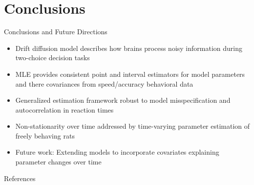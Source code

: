 \documentclass[8pt]{beamer}
\begin{document}
\section{Conclusions}

\begin{frame}{Conclusions and Future Directions}
    \begin{itemize}
        \item Drift diffusion model describes how brains process noisy information during two-choice decision tasks \vspace{0.25cm}
        
        \item MLE provides consistent point and interval estimators for model parameters and there covariances from speed/accuracy behavioral data \vspace{0.25cm}
        
        \item Generalized estimation framework robust to model misspecification and autocorrelation in reaction times \vspace{0.25cm}
        
        \item Non-stationarity over time addressed by time-varying parameter estimation of freely behaving rats \vspace{0.25cm}
        
        \item Future work: Extending models to incorporate covariates explaining parameter changes over time
    \end{itemize}
\end{frame}

\begin{frame}{References}
    \small
    
\end{frame}
\end{document}

